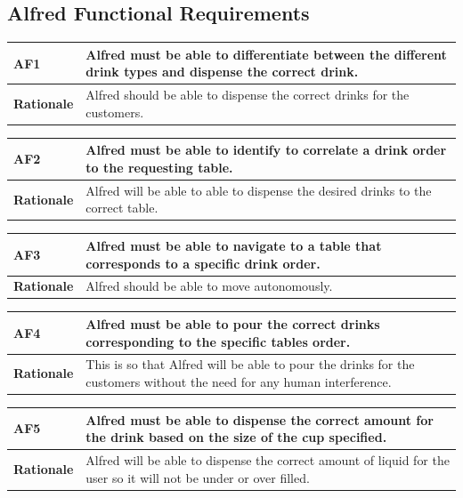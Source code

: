 \documentclass [11pt]{article}
\begin{document}
\subsection{Alfred Functional Requirements}

\begin{longtable}{| p{ } | p{ } | }\hline 
\rowcolor{tableCell}\textbf{AF1} & Alfred must be able to differentiate between the different drink types and dispense the correct drink.\\ \hline
\textbf{Rationale} & Alfred should be able to dispense the correct drinks for the customers.\\ \hline 
\end{longtable}

\begin{longtable}{| p{ } | p{ } | }\hline 
\rowcolor{tableCell}\textbf{AF2} & Alfred must be able to identify to correlate a drink order to the requesting table.\\ \hline
\textbf{Rationale} &  Alfred will be able to able to dispense the desired drinks to the correct table.\\ \hline 
\end{longtable}

\begin{longtable}{| p{ } | p{ } | }\hline 
\rowcolor{tableCell}\textbf{AF3} &  Alfred must be able to navigate to a table that corresponds to a specific drink order. \\ \hline
\textbf{Rationale} & Alfred should be able to move autonomously. \\ \hline 
\end{longtable}

\begin{longtable}{| p{ } | p{ } | }\hline 
\rowcolor{tableCell}\textbf{AF4} & Alfred must be able to pour the correct drinks corresponding to the specific tables order.\\ \hline
\textbf{Rationale} &  This is so that Alfred will be able to pour the drinks for the customers without the need for any human interference. \\ \hline 
\end{longtable}

\begin{longtable}{| p{ } | p{ } | }\hline 
\rowcolor{tableCell}\textbf{AF5} & Alfred must be able to dispense the correct amount for the drink based on the size of the cup specified.\\ \hline
\textbf{Rationale} &  Alfred will be able to dispense the correct amount of liquid for the user so it will not be under or over filled. \\ \hline 
\end{longtable}
\end{document}
